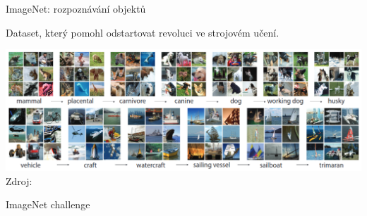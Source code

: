 \documentclass[handout,aspectratio=169,dvipsnames]{beamer}
\begin{document}

\begin{frame}{ImageNet: rozpoznávání objektů}

    \begin{center}
        Dataset, který pomohl odstartovat revoluci ve strojovém učení.
    \end{center}

    \centering

    \includegraphics[scale=.34]{./img/imagenet.png} \\
    {\tiny Zdroj: \citet[obr.\ 1]{deng2009imagenet}}


\end{frame}


\begin{frame}{ImageNet challenge}

    \centering
    

\end{frame}

\end{document}

